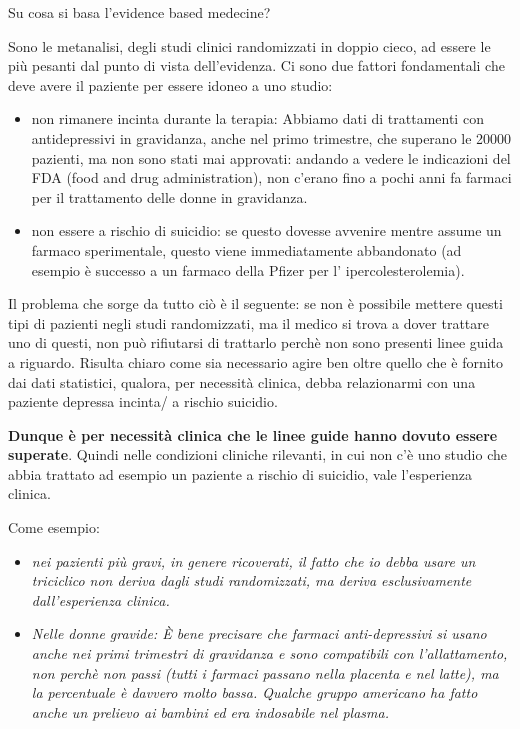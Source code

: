 Su cosa si basa l'evidence based medecine?

Sono le metanalisi, degli studi clinici randomizzati in doppio cieco, ad
essere le più pesanti dal punto di vista dell'evidenza. Ci sono due
fattori fondamentali che deve avere il paziente per essere idoneo a uno
studio:

\begin{itemize}
\item
  non rimanere incinta durante la terapia: Abbiamo dati di trattamenti
  con antidepressivi in gravidanza, anche nel primo trimestre, che
  superano le 20000 pazienti, ma non sono stati mai approvati: andando a
  vedere le indicazioni del FDA (food and drug administration), non
  c'erano fino a pochi anni fa farmaci per il trattamento delle donne in
  gravidanza.
\item
  non essere a rischio di suicidio: se questo dovesse avvenire mentre
  assume un farmaco sperimentale, questo viene immediatamente
  abbandonato (ad esempio è successo a un farmaco della Pfizer per l'
  ipercolesterolemia).
\end{itemize}

Il problema che sorge da tutto ciò è il seguente: se non è possibile
mettere questi tipi di pazienti negli studi randomizzati, ma il medico
si trova a dover trattare uno di questi, non può rifiutarsi di trattarlo
perchè non sono presenti linee guida a riguardo. Risulta chiaro come sia
necessario agire ben oltre quello che è fornito dai dati statistici,
qualora, per necessità clinica, debba relazionarmi con una paziente
depressa incinta/ a rischio suicidio.

\textbf{Dunque è per necessità clinica che le linee guide hanno dovuto
essere superate}. Quindi nelle condizioni cliniche rilevanti, in cui non
c'è uno studio che abbia trattato ad esempio un paziente a rischio di
suicidio, vale l'esperienza clinica.

Come esempio:

\begin{itemize}
\item
  \emph{nei pazienti più gravi, in genere ricoverati, il fatto che io
  debba usare un triciclico non deriva dagli studi randomizzati, ma
  deriva esclusivamente dall'esperienza clinica.}
\item
  \emph{Nelle donne gravide: È bene precisare che farmaci
  anti-depressivi si usano anche nei primi trimestri di gravidanza e
  sono compatibili con l'allattamento, non perchè non passi (tutti i
  farmaci passano nella placenta e nel latte), ma la percentuale è
  davvero molto bassa. Qualche gruppo americano ha fatto anche un
  prelievo ai bambini ed era indosabile nel plasma.}
\end{itemize}

